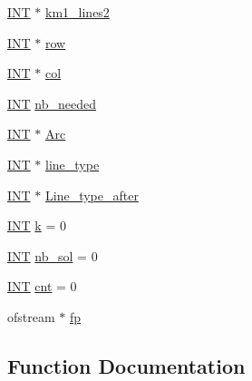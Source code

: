 \begin{DoxyCompactItemize}
\item 
\mbox{\hyperlink{galois_8h_a09fddde158a3a20bd2dcadb609de11dc}{I\+NT}} $\ast$ \mbox{\hyperlink{k__arc__lifting_8_c_a4f70864b8dc6ef60c14b23b759d8809e}{km1\+\_\+lines2}}
\item 
\mbox{\hyperlink{galois_8h_a09fddde158a3a20bd2dcadb609de11dc}{I\+NT}} $\ast$ \mbox{\hyperlink{k__arc__lifting_8_c_a08f320aaf2bdf98a334241375f7ce1e7}{row}}
\item 
\mbox{\hyperlink{galois_8h_a09fddde158a3a20bd2dcadb609de11dc}{I\+NT}} $\ast$ \mbox{\hyperlink{k__arc__lifting_8_c_a567706515ba719f4d268271745d197e3}{col}}
\item 
\mbox{\hyperlink{galois_8h_a09fddde158a3a20bd2dcadb609de11dc}{I\+NT}} \mbox{\hyperlink{k__arc__lifting_8_c_a05b64921dd47182d80d03435b070c064}{nb\+\_\+needed}}
\item 
\mbox{\hyperlink{galois_8h_a09fddde158a3a20bd2dcadb609de11dc}{I\+NT}} $\ast$ \mbox{\hyperlink{k__arc__lifting_8_c_a95284ca1ebfe74822e0c5a708e4b6bac}{Arc}}
\item 
\mbox{\hyperlink{galois_8h_a09fddde158a3a20bd2dcadb609de11dc}{I\+NT}} $\ast$ \mbox{\hyperlink{k__arc__lifting_8_c_a417b2be1bd9c81dc779074455c70eb2d}{line\+\_\+type}}
\item 
\mbox{\hyperlink{galois_8h_a09fddde158a3a20bd2dcadb609de11dc}{I\+NT}} $\ast$ \mbox{\hyperlink{k__arc__lifting_8_c_a78c02ad999171d33c19cb4c678a255f8}{Line\+\_\+type\+\_\+after}}
\item 
\mbox{\hyperlink{galois_8h_a09fddde158a3a20bd2dcadb609de11dc}{I\+NT}} \mbox{\hyperlink{k__arc__lifting_8_c_a43fa990200c3ddd47c35f151bd4d66bf}{k}} = 0
\item 
\mbox{\hyperlink{galois_8h_a09fddde158a3a20bd2dcadb609de11dc}{I\+NT}} \mbox{\hyperlink{k__arc__lifting_8_c_a0029b734487624c93c3a72d74a8f2bf9}{nb\+\_\+sol}} = 0
\item 
\mbox{\hyperlink{galois_8h_a09fddde158a3a20bd2dcadb609de11dc}{I\+NT}} \mbox{\hyperlink{k__arc__lifting_8_c_aff203aa6ff59cc8d67760a705bfc95ce}{cnt}} = 0
\item 
ofstream $\ast$ \mbox{\hyperlink{k__arc__lifting_8_c_a67cc9fbd0817c2d140368e5ed1f2a44d}{fp}}
\end{DoxyCompactItemize}


\subsection{Function Documentation}
\mbox{\label{k__arc__lifting_8_c_aede97f2af2307a758b06ad6506762b79}} 
